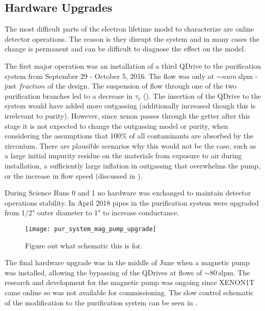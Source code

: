 \subsection{Hardware Upgrades}
\label{subsec:electron_lifetime_model_ops}
The most difficult parts of the electron lifetime model to characterize are online detector operations.  The reason is they disrupt the
system and in many cases the change is permanent and can be difficult to diagnose the effect on the model.

The first major operation was an installation of a third QDrive to the purification system from September 29 - October 5, 2016.  The
flow was only at ${\sim} num\ \mathrm{slpm}$ - just $fraction$ of the design.  The suspension of flow through one of the two purification
branches led to a decrease in $\tau_e$ (\figref{}).  The insertion of the QDrive to the system would have added more outgassing
(additionally increased  though this is irrelevant to purity).  However, since xenon passes through the getter after this
stage it is not expected to change the outgassing model or purity, when considering the assumptions that 100\% of all contaminants are
absorbed by the zirconium.  There are plausible scenarios why this would not be the case, such as a large initial impurity residue on the
materials from exposure to air during installation, a sufficiently large inflation in outgassing that overwhelms the pump, or the increase
in flow speed (discussed in ).

During Science Runs 0 and 1 no hardware was exchanged to maintain detector operations stability.  In April 2018 pipes in the purification
system were upgraded from 1/2" outer diameter to 1" to increase conductance.

\begin{figure}
\centering
\texttt{[image: pur\_system\_mag\_pump\_upgrade]}
\caption{Figure out what schematic this is for.}
\label{fig:electron_lifetime_model_ops_pur_pipes_upgrade}
\end{figure}

The final hardware upgrade was in the middle of June when a magnetic pump was installed, allowing the bypassing of the QDrives at flows
of ${\sim} 80\ \mathrm{slpm}$.  The research and development for the magnetic pump was ongoing since XENON1T came online so was not
available for commissioning.  The slow control schematic of the modification to the purification system can be seen in
.

